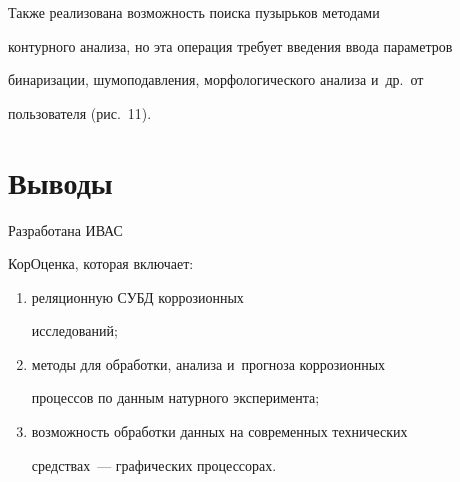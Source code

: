       


   Также реализована возможность поиска пузырьков методами 


контурного анализа, но эта операция требует введения ввода параметров 


бинаризации, шумоподавления, морфологического анализа и~др.\ от 


пользователя (рис.~11).


   


\section{Выводы}


    


   Разработана ИВАС


КорОценка, которая  включает:


   \begin{enumerate}[(1)]


   \item реляционную СУБД коррозионных 


исследований;


   \item методы для обработки, анализа и~прогноза коррозионных 


процессов по данным натурного эксперимента;


   \item возможность обработки данных на современных технических 


средствах~--- графических процессорах.


   \end{enumerate}


   



